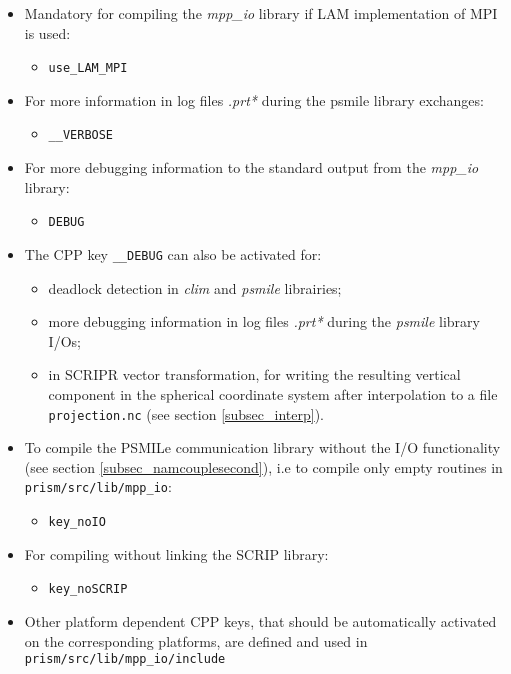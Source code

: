 \begin{itemize}
\item Mandatory for compiling the {\it mpp\_io} library if LAM
  implementation of MPI is used:
  \begin{itemize}
  \item{\tt use\_LAM\_MPI}
  \end{itemize}

\item For more information in log files {\it *.prt*} during the psmile
  library exchanges:
  \begin{itemize}
  \item{\tt \_\_VERBOSE}
  \end{itemize}

\item For more debugging information to the standard output from the
  {\it mpp\_io} library:
  \begin{itemize}
  \item{\tt DEBUG}
  \end{itemize}

\item The CPP key {\tt \_\_DEBUG} can also be activated for:

  \begin{itemize}
  \item deadlock detection in {\it clim} and {\it psmile} librairies;
  \item more debugging information in log files {\it *.prt*} during
    the {\it psmile} library I/Os;
  \item in SCRIPR vector transformation, for writing the resulting
    vertical component in the spherical coordinate system after
    interpolation to a file {\tt projection.nc} (see section
    \ref{subsec_interp}).
  \end{itemize}

\item To compile the PSMILe communication library without the I/O
  functionality (see section \ref{subsec_namcouplesecond}), i.e to
  compile only empty routines in {\tt prism/src/lib/mpp\_io}:
  \begin{itemize}
  \item{\tt key\_noIO}
  \end{itemize}

\item For compiling without linking the SCRIP library:
  \begin{itemize}
  \item {\tt key\_noSCRIP}
  \end{itemize}

\item Other platform dependent CPP keys, that should be automatically
  activated on the corresponding platforms, are defined and used in {\tt
    prism/src/lib/mpp\_io/include}

\end{itemize}

